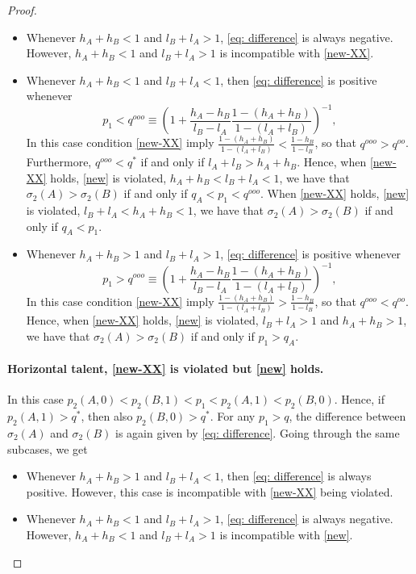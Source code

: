 \documentclass[12pt,american]{paper}
\theoremstyle{remark}
\begin{document}
\begin{proof}
\begin{itemize}
\item Whenever $h_A+h_B<1$ and $l_B+l_A>1$, \eqref{eq: difference} is always negative. However, $h_A+h_B<1$ and $l_B+l_A>1$ is incompatible with \eqref{new-XX}.%

\item Whenever $h_A+h_B<1$ and $l_B+l_A<1$, then \eqref{eq: difference} is positive whenever 
\[  p_1<q^{ooo}\equiv\left(1+\frac{h_A-h_B}{l_B-l_A}\frac{1-(h_A+h_B)}{1-(l_A+l_B)} \right)^{-1},
\]
In this case condition \eqref{new-XX} imply $\frac{1-(h_A+h_B)}{1-(l_A+l_B)}<\frac{1-h_B}{1-l_B}$, so that  $q^{ooo}>q^{oo}$. Furthermore,  $q^{ooo}<q^*$ if and only if $l_A+l_B>h_A+h_B$.  Hence, when \eqref{new-XX} holds, \eqref{new} is violated, $h_A+h_B<l_B+l_A<1$, we have that  $\sigma_2(A)>\sigma_2(B)$ if and only if $q_A<p_1<q^{ooo}$. When \eqref{new-XX} holds, \eqref{new} is violated, $l_B+l_A<h_A+h_B<1$, we have that  $\sigma_2(A)>\sigma_2(B)$ if and only if $q_A<p_1$.


\item Whenever $h_A+h_B>1$ and $l_B+l_A>1$, \eqref{eq: difference} is positive whenever 
\[  p_1>q^{ooo}\equiv\left(1+\frac{h_A-h_B}{l_B-l_A}\frac{1-(h_A+h_B)}{1-(l_A+l_B)} \right)^{-1},
\]
In this case condition \eqref{new-XX} imply $\frac{1-(h_A+h_B)}{1-(l_A+l_B)}>\frac{1-h_B}{1-l_B}$, so that  $q^{ooo}<q^{oo}$.  Hence,   when \eqref{new-XX} holds, \eqref{new} is violated, $l_B+l_A>1$ and $h_A+h_B>1$, we have that  $\sigma_2(A)>\sigma_2(B)$ if and only if $p_1 > q_A$.
\end{itemize}


\paragraph{Horizontal talent, \eqref{new-XX} is violated but \eqref{new} holds.} In this case  $p_2(A,0)<p_2(B,1)<p_1<p_2(A,1)<p_2(B,0)$. Hence, if $p_2(A,1)>q^*$, then also $p_2(B,0)>q^*$. For any $p_1>q$, the difference between $\sigma_2(A)$ and $\sigma_2(B)$ is again given by \eqref{eq: difference}. Going through the same subcases, we get
\begin{itemize}
\item Whenever $h_A+h_B>1$ and $l_B+l_A<1$, then \ref{eq: difference} is always positive. However, this case is incompatible with \eqref{new-XX} being violated.

\item Whenever $h_A+h_B<1$ and $l_B+l_A>1$, \eqref{eq: difference} is always negative. However, $h_A+h_B<1$ and $l_B+l_A>1$ is incompatible with \eqref{new}.%


\end{itemize}
\end{proof}
\end{document}
